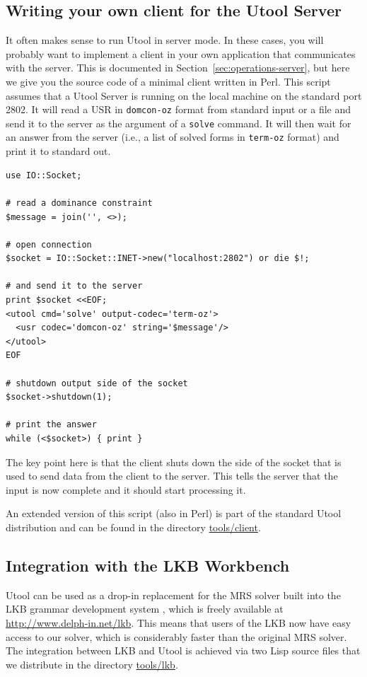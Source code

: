 \subsection{Writing your own client for the Utool Server}
\label{sec:practice-client}

It often makes sense to run Utool in server mode. In these cases, you
will probably want to implement a client in your own application that
communicates with the server. This is documented in
Section~\ref{sec:operations-server}, but here we give you the source
code of a minimal client written in Perl. This script assumes that a
Utool Server is running on the local machine on the standard port
2802. It will read a USR in \verb?domcon-oz? format from standard
input or a file and send it to the server as the argument of a
\verb?solve? command. It will then wait for an answer from the server
(i.e., a list of solved forms in \verb?term-oz? format) and print it
to standard out.

\begin{verbatim}
use IO::Socket;

# read a dominance constraint
$message = join('', <>);

# open connection
$socket = IO::Socket::INET->new("localhost:2802") or die $!;

# and send it to the server
print $socket <<EOF;
<utool cmd='solve' output-codec='term-oz'>
  <usr codec='domcon-oz' string='$message'/>
</utool>
EOF

# shutdown output side of the socket
$socket->shutdown(1);

# print the answer 
while (<$socket>) { print }
\end{verbatim}

The key point here is that the client shuts down the side of the
socket that is used to send data from the client to the server. This
tells the server that the input is now complete and it should start
processing it.

An extended version of this script (also in Perl) is part of the
standard Utool distribution and can be found in the directory
\url{tools/client}. 




\subsection{Integration with the LKB Workbench}
\label{sec:integration-lkb}


Utool can be used as a drop-in replacement for the MRS solver built
into the LKB grammar development system \cite{Copestake:LKB-Book},
which is freely available at \url{http://www.delph-in.net/lkb}. This means that users of the
LKB now have easy access to our solver, which is considerably faster
than the original MRS solver. The integration between LKB and Utool is
achieved via two Lisp source files that we distribute in the directory
\url{tools/lkb}.

